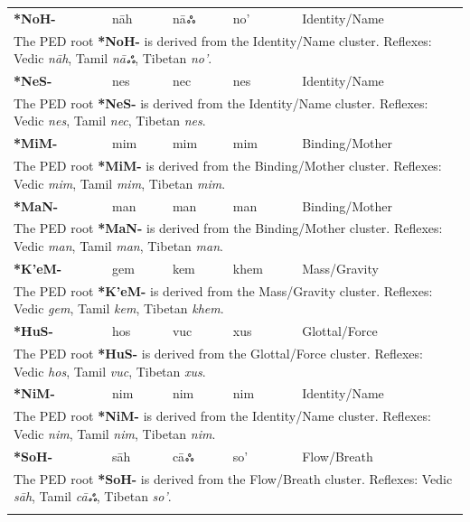 \begin{longtable}{p{} p{} p{} p{} p{}}
\textbf{*NoH-} & nāh & nāஃ & no' & Identity/Name \\ 
\multicolumn{5}{p{\textwidth}}{\small The PED root \textbf{*NoH-} is derived from the Identity/Name cluster. Reflexes: Vedic \textit{nāh}, Tamil \textit{nāஃ}, Tibetan \textit{no'}. } \\ \addlinespace 
\textbf{*NeS-} & nes & nec & nes & Identity/Name \\ 
\multicolumn{5}{p{\textwidth}}{\small The PED root \textbf{*NeS-} is derived from the Identity/Name cluster. Reflexes: Vedic \textit{nes}, Tamil \textit{nec}, Tibetan \textit{nes}. } \\ \addlinespace 
\textbf{*MiM-} & mim & mim & mim & Binding/Mother \\ 
\multicolumn{5}{p{\textwidth}}{\small The PED root \textbf{*MiM-} is derived from the Binding/Mother cluster. Reflexes: Vedic \textit{mim}, Tamil \textit{mim}, Tibetan \textit{mim}. } \\ \addlinespace 
\textbf{*MaN-} & man & man & man & Binding/Mother \\ 
\multicolumn{5}{p{\textwidth}}{\small The PED root \textbf{*MaN-} is derived from the Binding/Mother cluster. Reflexes: Vedic \textit{man}, Tamil \textit{man}, Tibetan \textit{man}. } \\ \addlinespace 
\textbf{*K'eM-} & gem & kem & khem & Mass/Gravity \\ 
\multicolumn{5}{p{\textwidth}}{\small The PED root \textbf{*K'eM-} is derived from the Mass/Gravity cluster. Reflexes: Vedic \textit{gem}, Tamil \textit{kem}, Tibetan \textit{khem}. } \\ \addlinespace 
\textbf{*HuS-} & hos & vuc & xus & Glottal/Force \\ 
\multicolumn{5}{p{\textwidth}}{\small The PED root \textbf{*HuS-} is derived from the Glottal/Force cluster. Reflexes: Vedic \textit{hos}, Tamil \textit{vuc}, Tibetan \textit{xus}. } \\ \addlinespace 
\textbf{*NiM-} & nim & nim & nim & Identity/Name \\ 
\multicolumn{5}{p{\textwidth}}{\small The PED root \textbf{*NiM-} is derived from the Identity/Name cluster. Reflexes: Vedic \textit{nim}, Tamil \textit{nim}, Tibetan \textit{nim}. } \\ \addlinespace 
\textbf{*SoH-} & sāh & cāஃ & so' & Flow/Breath \\ 
\multicolumn{5}{p{\textwidth}}{\small The PED root \textbf{*SoH-} is derived from the Flow/Breath cluster. Reflexes: Vedic \textit{sāh}, Tamil \textit{cāஃ}, Tibetan \textit{so'}. } \\ \addlinespace 

\end{longtable}
